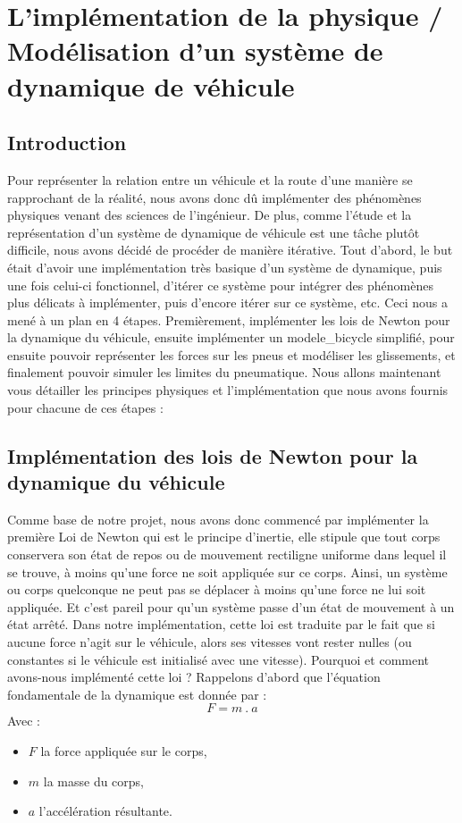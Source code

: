 \usepackage{glossaries}\section{L'implémentation de la physique / Modélisation d'un système de dynamique de véhicule}\label{sec:l'implementation-de-la-physique-/-modelisation-d'un-systeme-de-dynamique-de-vehicule}
\subsection{Introduction}\label{subsec:introduction}
Pour représenter la relation entre un véhicule et la route d'une manière se rapprochant de la réalité, nous avons donc dû implémenter des phénomènes physiques venant des sciences de l'ingénieur.
De plus, comme l'étude et la représentation d'un système de dynamique de véhicule est une tâche plutôt difficile, nous avons décidé de procéder de manière itérative.
Tout d'abord, le but était d'avoir une implémentation très basique d'un système de dynamique, puis une fois celui-ci fonctionnel, d'itérer ce système pour intégrer des phénomènes plus délicats à implémenter, puis d'encore itérer sur ce système, etc.
Ceci nous a mené à un plan en 4 étapes.
Premièrement, implémenter les lois de Newton pour la dynamique du véhicule, ensuite implémenter un \gls{modele_bicycle} simplifié, pour ensuite pouvoir représenter les forces sur les pneus et modéliser les glissements, et finalement pouvoir simuler les limites du pneumatique.
Nous allons maintenant vous détailler les principes physiques et l'implémentation que nous avons fournis pour chacune de ces étapes :

\subsection{Implémentation des lois de Newton pour la dynamique du véhicule}\label{subsec:implementation-des-lois-de-newton-pour-la-dynamique-du-vehicule}

Comme base de notre projet, nous avons donc commencé par implémenter la première Loi de Newton qui est le principe d'inertie, elle stipule que tout corps conservera son état de repos ou de mouvement rectiligne uniforme dans lequel il se trouve, à moins qu'une force ne soit appliquée sur ce corps.
Ainsi, un système ou corps quelconque ne peut pas se déplacer à moins qu'une force ne lui soit appliquée.
Et c'est pareil pour qu'un système passe d'un état de mouvement à un état arrêté.
Dans notre implémentation, cette loi est traduite par le fait que si aucune force n'agit sur le véhicule, alors ses vitesses vont rester nulles (ou constantes si le véhicule est initialisé avec une vitesse).
Pourquoi et comment avons-nous implémenté cette loi ?
Rappelons d'abord que l'équation fondamentale de la dynamique est donnée par :
$$F = m \ .\  a$$
Avec :
\begin{itemize}
    \item $F$ la force appliquée sur le corps,
    \item $m$ la masse du corps,
    \item $a$ l'accélération résultante.
\end{itemize}

